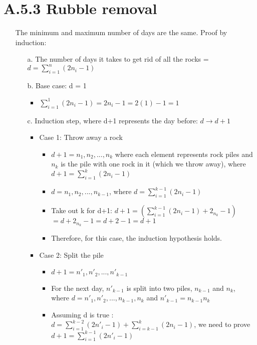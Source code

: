 \documentclass[12pt]{article}
\begin{document}
\section*{A.5.3 Rubble removal}
\begin{enumerate}
  \item[] The minimum and maximum number of days are the same. Proof by induction:
    \begin{enumerate}
      \item[a.] The number of days it takes to get rid of all the rocks = ${d = \sum_{i=1}^{n} (2n_i - 1)}$
      \item[b.] Base case: d = 1
        \begin{itemize}
          \item ${\sum_{i=1}^{1} (2n_i - 1) = 2n_i - 1 = 2(1) - 1 = 1}$
        \end{itemize}
      \item[c.] Induction step, where d+1 represents the day before: ${d\rightarrow d+1}$
        \begin{itemize}
          \item Case 1: Throw away a rock
            \begin{itemize}
              \item ${d+1 = n_1, n_2, ..., n_k}$ where each element represents rock piles and ${n_k}$ is the pile with one rock in it (which we throw away), where ${d+1 = \sum_{i=1}^{k} (2n_i - 1)}$
              \item ${d = n_1, n_2, ..., n_{k-1}}$, where ${d = \sum_{i=1}^{k-1} (2n_i -1)}$
              \item Take out k for d+1: ${d+1 = (\sum_{i=1}^{k-1} (2n_i -1) + 2_{n_k} - 1)}$ \\ ${= d + 2_{n_k} -1 = d + 2 - 1 = d + 1}$
              \item Therefore, for this case, the induction hypothesis holds.
            \end{itemize}
          \item Case 2: Split the pile
            \begin{itemize}
              \item ${d+1 = n'_1, n'_2, ..., n'_{k-1}}$
              \item For the next day, ${n'_{k-1}}$ is split into two piles, ${n_{k-1}}$ and ${n_k}$, \\ where ${d = n'_1, n'_2, ..., n_{k-1}, n_k}$ and ${n'_{k-1} = n_{k-1} n_k}$
              \item Assuming d is true : ${d = \sum_{i=1}^{k-2} (2n'_i -1) + \sum_{i=k-1}^{k} (2n_i -1)}$, we need to prove ${d+1 = \sum_{i=1}^{k-1} (2n'_i - 1)}$

\end{itemize}
\end{itemize}
\end{enumerate}
\end{enumerate}
\end{document}
